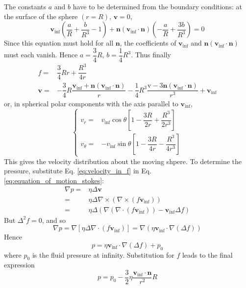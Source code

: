\documentclass[conference]{IEEEtran}
\theoremstyle{definition}
\theoremstyle{remark}
\begin{document}
    The constants $a$ and $b$ have to be determined from the boundary conditions: at the surface of the sphere $(r = R)$, $\mathbf{v} = 0$,
    \begin{equation*}
        \mathbf{v}_\mathrm{inf} \left( \dfrac{a}{R} + \dfrac{b}{R^3} - 1 \right) + \mathbf{n} (\mathbf{v}_\mathrm{inf} \cdot \mathbf{n}) \left( -\dfrac{a}{R} + \dfrac{3b}{R^3} \right) = 0
    \end{equation*}
    Since this equation must hold for all $\mathbf{n}$, the coefficients of $\mathbf{v}_\mathrm{inf}$ and $\mathbf{n} (\mathbf{v}_\mathrm{inf} \cdot \mathbf{n})$ must each vanish. Hence $a = \dfrac34R$, $b = \dfrac14R^3$. Thus finally
    \begin{align}
        f =& \dfrac34 Rr + \dfrac{R^3}{4r} \\
        \mathbf{v} =& -\dfrac34 R \dfrac{\mathbf{v}_\mathrm{inf} + \mathbf{n} (\mathbf{v}_\mathrm{inf} \cdot \mathbf{n})}r - \dfrac14 R^3 \dfrac{\mathrm{v} - 3\mathbf{n} (\mathbf{v}_\mathrm{inf} \cdot \mathbf{n})}{r^3} + \mathbf{v}_\mathrm{inf}
    \end{align}
    or, in spherical polar components with the axis parallel to $\mathbf{v}_\mathrm{inf}$,
    \begin{equation}
        \left\{
            \begin{aligned}
                v_r =& v_\mathrm{inf} \cos \theta \left[ 1 - \dfrac{3R}{2r} + \dfrac{R^3}{2r^3} \right] \\
                v_\theta =& -v_\mathrm{inf} \sin \theta \left[ 1 - \dfrac{3R}{4r} - \dfrac{R^3}{4r^3} \right]
            \end{aligned}
        \right.
        \label{eq:velocity_in_spherical_coordinates}
    \end{equation}
    This gives the velocity distribution about the moving shpere. To determine the pressure, substitute Eq. \ref{eq:velocity_in_f} in Eq. \ref{eq:equation_of_motion_stokes}:
    \begin{align*}
        \nabla p =& \eta \Delta \mathbf{v} \nonumber \\
        =& \eta \Delta \nabla \times (\nabla \times (f\mathbf{v}_\mathrm{inf})) \nonumber \\
        =& \eta \Delta (\nabla (\nabla \cdot(f \mathbf{v}_\mathrm{inf})) - \mathbf{v}_\mathrm{inf} \Delta f)
    \end{align*}
    But $\Delta^2 f = 0$, and so
    \begin{equation*}
        \nabla p = \nabla [\eta \Delta \nabla \cdot (f \mathbf{v}_\mathrm{inf})] = \nabla (\eta \mathbf{v}_\mathrm{inf} \cdot \nabla (\Delta f))
    \end{equation*}
    Hence
    \begin{equation}
        p = \eta \mathbf{v}_\mathrm{inf} \cdot \nabla  (\Delta f) + p_0
    \end{equation}
    where $p_0$ is the fluid pressure at infinity. Substitution for $f$ leads to the final expression
    \begin{equation}
        p = p_0 - \dfrac32 \eta \dfrac{\mathbf{v}_\mathrm{inf} \cdot \mathbf{n}}{r^2} R
    \end{equation}
\end{document}

